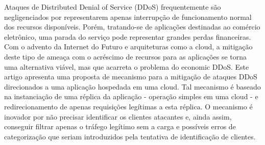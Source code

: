 
Ataques de Distributed Denial of Service (DDoS) frequentemente são negligenciados por representarem apenas interrupção de funcionamento normal dos recursos disponíveis. Porém, tratando-se de aplicações destinadas ao comércio eletrônico, uma parada do serviço pode representar grandes perdas financeiras. Com o advento da Internet do Futuro e arquiteturas como a cloud, a mitigação deste tipo de ameaça com o acréscimo de recursos para as aplicações se torna uma alternativa viável, mas que acarreta o problema do economic DDoS. Este artigo apresenta uma proposta de mecanismo para a mitigação de ataques DDoS direcionados a uma aplicação hospedada em uma cloud. Tal mecanismo é baseado na instanciação de uma réplica da aplicação - operação simples em uma cloud - e redirecionamento de apenas requisições legítimas a esta réplica. O mecanismo é inovador por não precisar identificar os clientes atacantes e, ainda assim, conseguir filtrar apenas o tráfego legítimo sem a carga e possíveis erros de categorização que seriam introduzidos pela tentativa de identificação de clientes.
